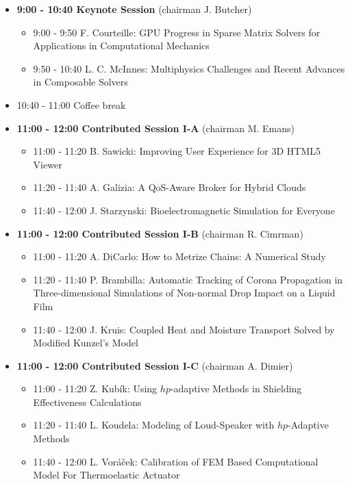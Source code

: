 \documentclass[10pt, A4]{article}%
\begin{document}
\begin{itemize}    
  \item {\bf 9:00 - 10:40 Keynote Session} (chairman J. Butcher) 
  \begin{itemize}
    \item 9:00 - 9:50 F. Courteille: GPU Progress in Sparse Matrix Solvers for Applications in Computational Mechanics
    \item 9:50 - 10:40 L. C. McInnes: Multiphysics Challenges and Recent Advances in Composable Solvers
  \end{itemize}
  \item 10:40 - 11:00 Coffee break
  \item {\bf 11:00 - 12:00 Contributed Session I-A} (chairman M. Emans) 
  \begin{itemize}
    \item 11:00 - 11:20 B. Sawicki: Improving User Experience for 3D HTML5 Viewer
    \item 11:20 - 11:40 A. Galizia: A QoS-Aware Broker for Hybrid Clouds
    \item 11:40 - 12:00 J. Starzynski: Bioelectromagnetic Simulation for Everyone 
  \end{itemize}
  \item {\bf 11:00 - 12:00 Contributed Session I-B} (chairman R. Cimrman) 
  \begin{itemize}
	\item 11:00 - 11:20 A. DiCarlo: How to Metrize Chains: A Numerical Study  
    \item 11:20 - 11:40 P. Brambilla: Automatic Tracking of Corona Propagation in Three-dimensional Simulations of Non-normal Drop Impact on a Liquid Film       
    \item 11:40 - 12:00 J. Kruis: Coupled Heat and Moisture Transport Solved by Modified Kunzel's Model
  \end{itemize}
  \item {\bf 11:00 - 12:00 Contributed Session I-C} (chairman A. Dimier) 
  \begin{itemize}
    \item 11:00 - 11:20 Z. Kub\'{i}k: Using $hp$-adaptive Methods in Shielding Effectiveness Calculations
    \item 11:20 - 11:40 L. Koudela: Modeling of Loud-Speaker with $hp$-Adaptive Methods  
    \item 11:40 - 12:00 L. Vor\'{a}\v{c}ek: Calibration of FEM Based Computational Model For Thermoelastic Actuator       
  \end{itemize}

\end{itemize}
\end{document}
